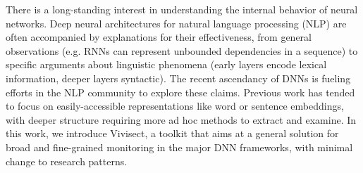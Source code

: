 There is a long-standing interest in understanding the internal behavior of neural networks.  Deep neural architectures for natural language processing (NLP) are often accompanied by explanations for their effectiveness, from general observations (e.g. RNNs can represent unbounded dependencies in a sequence) to specific arguments about linguistic phenomena (early layers encode lexical information, deeper layers syntactic).  The recent ascendancy of DNNs is fueling efforts in the NLP community to explore these claims.  Previous work has tended to focus on easily-accessible representations like word or sentence embeddings, with deeper structure requiring more ad hoc methods to extract and examine.  In this work, we introduce Vivisect, a toolkit that aims at a general solution for broad and fine-grained monitoring in the major DNN frameworks, with minimal change to research patterns.
